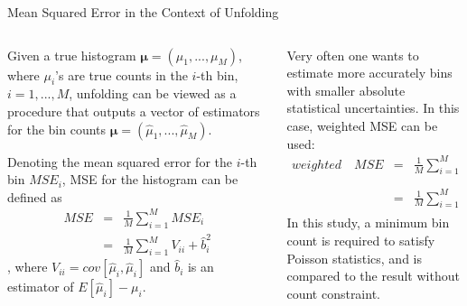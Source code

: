 \documentclass[aspectratio=169]{beamer}
\begin{document}
\begin{frame}{Mean Squared Error in the Context of Unfolding}
  \begin{columns}
    \begin{column}{.5\textwidth}
      \footnotesize
				Given a true histogram $\pmb{\mu}=(\mu_1,...,\mu_M)$, where $\mu_i$'s are true counts in the $i$-th bin, $i=1,...,M$, unfolding can be viewed as a procedure that outputs a vector of estimators for the bin counts $\pmb{\hat{\mu}}=(\hat{\mu}_1,...,\hat{\mu}_M)$.
				
				Denoting the mean squared error for the $i$-th bin $MSE_i$, MSE for the histogram can be defined as
				\begin{eqnarray}
				  MSE &=& \frac{1}{M}\sum_{i=1}^M MSE_i \nonumber\\
				  &=& \frac{1}{M}\sum_{i=1}^M V_{ii}+\hat{b}_i^2
				\end{eqnarray}
				, where $V_{ii}=cov[\hat{\mu}_i,\hat{\mu}_i]$ and $\hat{b}_i$ is an estimator of $E[\hat{\mu}_i]-\mu_i$.
    \end{column}
    \begin{column}{.5\textwidth}
      \footnotesize
			Very often one wants to estimate more accurately bins with smaller absolute statistical uncertainties. In this case, weighted MSE can be used:
			\begin{eqnarray}
			  weighted \quad MSE &=& \frac{1}{M}\sum_{i=1}^M \frac{MSE_i}{\hat{\mu}_i} \nonumber\\
			  &=& \frac{1}{M}\sum_{i=1}^M \frac{V_{ii}+\hat{b}_i^2}{\hat{\mu}_i}
			\end{eqnarray}
			In this study, a minimum bin count is required to satisfy Poisson statistics, and is compared to the result without count constraint.
		\end{column}
	\end{columns}
\end{frame}
\end{document}
